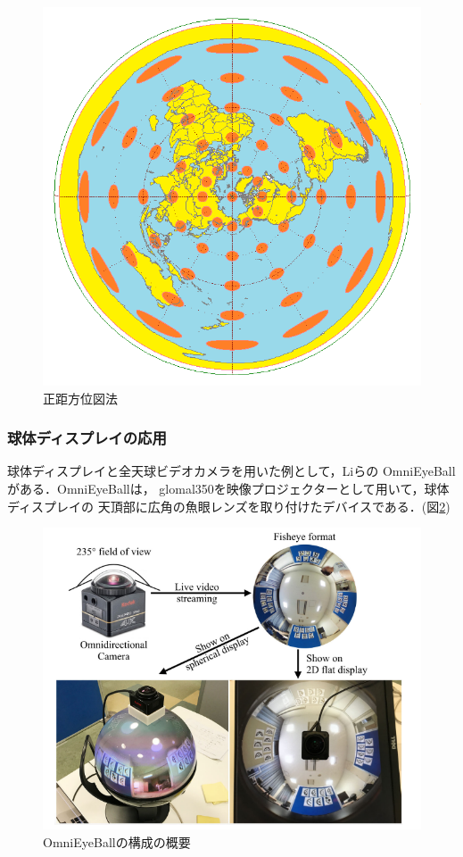 \begin{figure}[tbp]
  \centering
  \includegraphics[scale=0.8]{fig/teiso3.png}
  \caption{正距方位図法\cite{20}}\label{teiso3}
\end{figure}

\subsubsection*{球体ディスプレイの応用}
球体ディスプレイと全天球ビデオカメラを用いた例として，Liらの
OmniEyeBall\cite{18}\cite{24}がある．OmniEyeBallは，
glomal350を映像プロジェクターとして用いて，球体ディスプレイの
天頂部に広角の魚眼レンズを取り付けたデバイスである．(図\ref{proto})
\begin{figure}[tp]
  \centering
  \includegraphics[scale=0.6]{fig/OEBproto.png}
  \caption{OmniEyeBallの構成の概要\cite{24}}\label{proto}
\end{figure}

